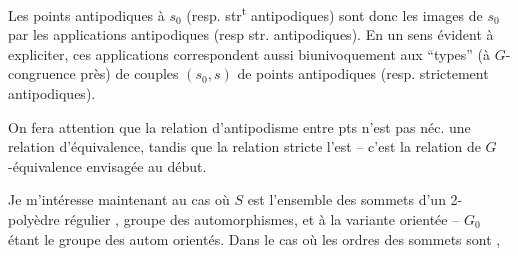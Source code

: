 Les points antipodiques à $s_0$ (resp. str\textsuperscript{t} antipodiques) sont donc les images de $s_0$ par les applications antipodiques (resp str. antipodiques). En un sens évident à expliciter, ces applications correspondent aussi biunivoquement aux ``types'' (à $G$-congruence près) de couples $(s_0,s)$ de points antipodiques (resp. strictement antipodiques).

On fera attention que la relation d'antipodisme entre pts n'est pas néc. une relation d'équivalence, tandis que la relation stricte l'est -- c'est la relation de $G$-équivalence envisagée au début.

Je m'intéresse maintenant au cas où $S$ est l'ensemble des sommets d'un 2-polyèdre  régulier ,   groupe des automorphismes,  et à la variante orientée -- $G_0$ étant  le groupe des autom orientés. Dans le cas où les ordres des sommets sont ,

